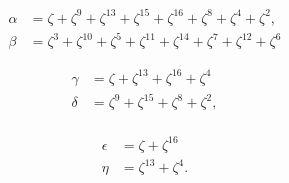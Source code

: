 \documentclass{ximera}
\begin{document}
\begin{example}
  \begin{align*}
  \alpha &= \zeta   + \zeta^9 + \zeta^{13} + \zeta^{15} + \zeta^{16} + \zeta^{8} + \zeta^{4} + \zeta^{2},\\
  \beta &= \zeta^3 + \zeta^{10} + \zeta^{5} + \zeta^{11} + \zeta^{14} + \zeta^{7} + \zeta^{12} + \zeta^{6}
  \end{align*}

  \begin{align*}
    \gamma &= \zeta   + \zeta^{13} + \zeta^{16} + \zeta^{4}\\
    \delta &= \zeta^9 + \zeta^{15} + \zeta^{8} + \zeta^{2},\\
  \end{align*}


  \begin{align*}
    \epsilon &= \zeta + \zeta^{16}\\
    \eta &= \zeta^{13} + \zeta^4.
  \end{align*}

\end{example}



\begin{theorem}
\end{theorem}
\end{document}
